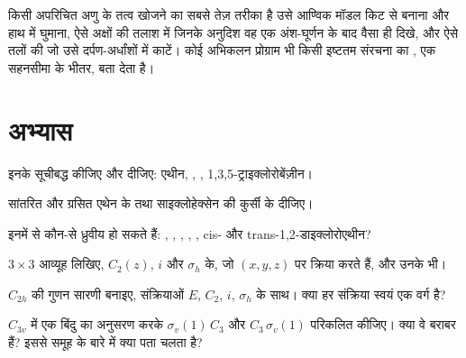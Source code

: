 \begin{inthelab}[मॉडल किट से सममिति]
किसी अपरिचित अणु के तत्व खोजने का सबसे तेज़ तरीका है उसे
आण्विक मॉडल किट से बनाना और हाथ में घुमाना, ऐसे अक्षों की तलाश में
जिनके अनुदिश वह एक अंश-घूर्णन के बाद वैसा ही दिखे, और ऐसे तलों की जो
उसे दर्पण-अर्धांशों में काटें। कोई अभिकलन प्रोग्राम भी किसी इष्टतम संरचना का
, एक सहनसीमा के भीतर, बता देता है।
\end{inthelab}

\section{अभ्यास}

\begin{exercise}[$\star$]\label{exo:b3:point-groups:1}
इनके  सूचीबद्ध कीजिए और  दीजिए: एथीन, ,
, 1,3,5-ट्राइक्लोरोबेंज़ीन।
\end{exercise}

\begin{exercise}[$\star$]\label{exo:b3:point-groups:2}
सांतरित और ग्रसित एथेन के तथा साइक्लोहेक्सेन की कुर्सी के 
दीजिए।
\end{exercise}

\begin{exercise}[$\star$]\label{exo:b3:point-groups:3}
इनमें से कौन-से ध्रुवीय हो सकते हैं: , , , , ,
cis- और trans-1,2-डाइक्लोरोएथीन?
\end{exercise}

\begin{exercise}[$\star$]\label{exo:b3:point-groups:4}
$3\times3$ आव्यूह लिखिए, $C_2(z)$, $i$ और $\sigma_h$ के, जो $(x, y, z)$ पर
क्रिया करते हैं, और उनके  भी।
\end{exercise}

\begin{exercise}[$\star\star$]\label{exo:b3:point-groups:5}
$C_{2h}$ की गुणन सारणी बनाइए, संक्रियाओं $E$, $C_2$, $i$,
$\sigma_h$ के साथ। क्या हर संक्रिया स्वयं एक वर्ग है?
\end{exercise}

\begin{exercise}[$\star\star$]\label{exo:b3:point-groups:6}
$C_{3v}$ में एक बिंदु का अनुसरण करके $\sigma_v(1)\,C_3$ और $C_3\,\sigma_v(1)$ परिकलित कीजिए।
क्या वे बराबर हैं? इससे समूह के बारे में क्या पता चलता है?
\end{exercise}

